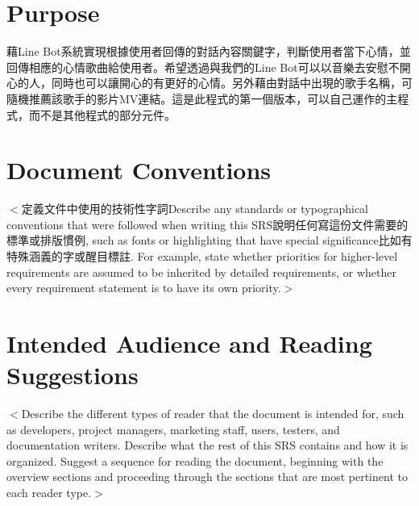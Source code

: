\documentclass{scrreprt}
\begin{document}
\section{Purpose}
\begin{CJK}{UTF8}{<font>}
藉Line Bot系統實現根據使用者回傳的對話內容關鍵字，判斷使用者當下心情，並回傳相應的心情歌曲給使用者。希望透過與我們的Line Bot可以以音樂去安慰不開心的人，同時也可以讓開心的有更好的心情。另外藉由對話中出現的歌手名稱，可隨機推薦該歌手的影片MV連結。這是此程式的第一個版本，可以自己運作的主程式，而不是其他程式的部分元件。
\end{CJK}

\section{Document Conventions}
\begin{CJK}{UTF8}{<font>}
$<$定義文件中使用的技術性字詞Describe any standards or typographical conventions that were followed when 
writing this SRS說明任何寫這份文件需要的標準或排版慣例, such as fonts or highlighting that have special significance比如有特殊涵義的字或醒目標註.  
For example, state whether priorities  for higher-level requirements are assumed 
to be inherited by detailed requirements, or whether every requirement statement 
is to have its own priority.$>$
\end{CJK}

\section{Intended Audience and Reading Suggestions}
\begin{CJK}{UTF8}{<font>}
$<$Describe the different types of reader that the document is intended for, 
such as developers, project managers, marketing staff, users, testers, and 
documentation writers. Describe what the rest of this SRS contains and how it is 
organized. Suggest a sequence for reading the document, beginning with the 
overview sections and proceeding through the sections that are most pertinent to 
each reader type.$>$
\end{CJK}
\end{document}
